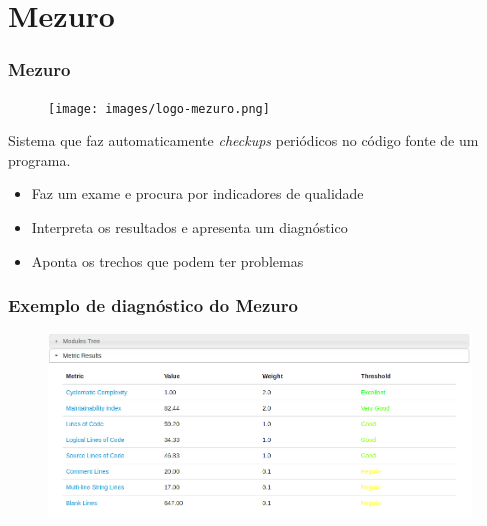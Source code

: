 \documentclass{beamer}
\begin{document}
\section{Mezuro}
\begin{frame}
  \frametitle{Mezuro}
  \begin{figure}
    \begin{flushleft}
    \begin{center}
    \texttt{[image: images/logo-mezuro.png]}
    \end{center}

      \label{fig:logo-mezuro}
    \end{flushleft}
  \end{figure}

  Sistema que faz automaticamente \textit{checkups} periódicos no código fonte de um programa.
  \begin{itemize}
    \item Faz um exame e procura por indicadores de qualidade
    \item Interpreta os resultados e apresenta um diagnóstico
    \item Aponta os trechos que podem ter problemas
  \end{itemize}
\end{frame}

\begin{frame}
  \frametitle{Exemplo de diagnóstico do Mezuro}
  \begin{figure}
    \begin{flushleft}
    \begin{center}
    \includegraphics[width=\textwidth]{images/metric_results.png}
    \end{center}

      \label{fig:metric_results}
    \end{flushleft}
  \end{figure}
\end{frame}
\end{document}
